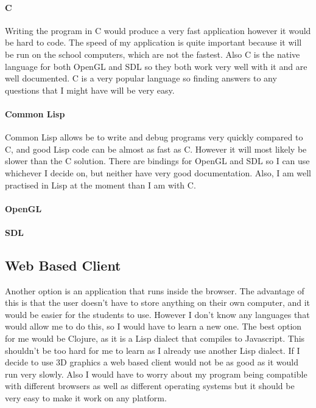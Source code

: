 \paragraph{C}
Writing the program in C would produce a very fast application however it would
be hard to code. The speed of my application is quite important because it will
be run on the school computers, which are not the fastest. Also C is the native
language for both OpenGL and SDL so they both work very well with it and are
well documented. C is a very popular language so finding answers to any
questions that I might have will be very easy.

\paragraph{Common Lisp} 
Common Lisp allows be to write and debug programs very quickly compared to C,
and good Lisp code can be almost as fast as C. However it will most likely be
slower than the C solution. There are bindings for OpenGL and SDL so I can use
whichever I decide on, but neither have very good documentation. Also, I am well
practised in Lisp at the moment than I am with C.

\paragraph{OpenGL}

\paragraph{SDL}

\subsection{Web Based Client}
Another option is an application that runs inside the browser. The advantage of
this is that the user doesn't have to store anything on their own computer, and
it would be easier for the students to use. However I don't know any languages
that would allow me to do this, so I would have to learn a new one. The best
option for me would be Clojure, as it is a Lisp dialect that compiles to
Javascript. This shouldn't be too hard for me to learn as I already use another
Lisp dialect. If I decide to use 3D graphics a web based client would not be as
good as it would run very slowly. Also I would have to worry about my program
being compatible with different browsers as well as different operating systems
but it should be very easy to make it work on any platform. 
